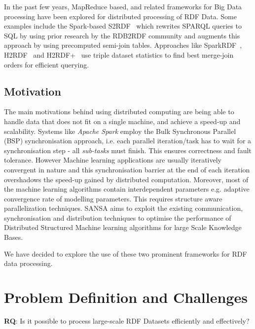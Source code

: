 In the past few years, MapReduce based, and related frameworks for Big Data processing have been explored for distributed processing of \gls{RDF} Data. 
Some examples include the Spark-based S2RDF~\cite{Schatzle:2016:SRQ:2977797.2977806} which rewrites SPARQL queries to SQL by using prior research by the RDB2RDF community and augments this approach by using precomputed semi-join tables. Approaches like SparkRDF~\cite{xu2015sparkrdf}, H2RDF~\cite{papailiou2013h} and H2RDF+~\cite{papailiou2012h2rdf} use triple dataset statistics to find best merge-join orders for efficient querying.


\subsection{Motivation}
\label{sec:motivation}

The main motivations behind using distributed computing are being able to handle data that does not fit on a single machine, and achieve a speed-up and scalability.
Systems like \textit{Apache Spark} employ the Bulk Synchronous Parallel (BSP) synchronisation approach, i.e. each parallel iteration/task has to wait for a synchronisation step - all \textit{sub-tasks} must finish. 
This ensures correctness and fault tolerance.
However Machine learning applications are usually iteratively convergent in nature and this synchronisation barrier at the end of each iteration overshadows the speed-up gained by distributed computation. 
Moreover, most of the machine learning algorithms contain interdependent parameters e.g. adaptive convergence rate of modelling parameters. 
This requires structure aware parallelization techniques. 
SANSA aims to exploit the existing communication, synchronisation and distribution techniques to optimise the performance of Distributed Structured Machine learning algorithms for large Scale Knowledge Bases.

We have decided to explore the use of these two prominent frameworks for RDF data processing.

\section{Problem Definition and Challenges}
\label{sec:problem-definition-and-challenges}


\begin{tcolorbox}
\textbf{RQ}: Is it possible to process large-scale RDF Datasets efficiently and effectively?
\end{tcolorbox}




